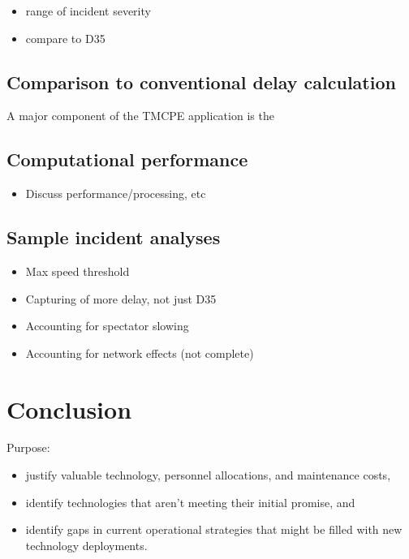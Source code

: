 \documentclass[12pt]{report}
\begin{document}
\begin{itemize}
\item range of incident severity
\item compare to D35
\end{itemize}

\section{Comparison to conventional delay calculation}
\label{sec:compare-conv}

A major component of the \ac{TMCPE} application is the 


\section{Computational performance}
\label{sec:comp-perf}




\begin{itemize}
\item Discuss performance/processing, etc
\end{itemize}

\section{Sample incident analyses}
\label{sec:inc-anal}

\begin{itemize}
\item Max speed threshold
\item Capturing of more delay, not just D35
\item Accounting for spectator slowing
\item Accounting for network effects (not complete)
\end{itemize}



\chapter{Conclusion}
\label{chap:conclusion}


Purpose:
\begin{itemize}
\item justify valuable technology, personnel allocations, and
  maintenance costs,
\item identify technologies that aren't meeting their initial promise,
  and
\item identify gaps in current operational strategies that might be
  filled with new technology deployments.
\end{itemize}
\end{document}
